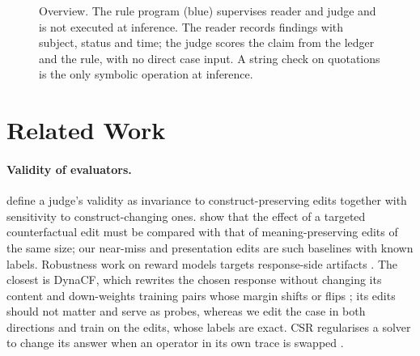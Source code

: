 \documentclass[11pt]{article}
\begin{document}
\begin{figure}[t]
\caption{Overview. The rule program (blue) supervises reader and judge and is
not executed at inference. The reader records findings with subject, status
and time; the judge scores the claim from the ledger and the rule, with no
direct case input. A string check on quotations is the only symbolic operation
at inference.}
\label{fig:overview}
\end{figure}

\section{Related Work}

\paragraph{Validity of evaluators.}
\citet{chen2026judge} define a judge's validity as invariance to
construct-preserving edits together with sensitivity to construct-changing
ones. \citet{yang2026compared} show that the effect of a targeted
counterfactual edit must be compared with that of meaning-preserving edits of
the same size; our near-miss and presentation edits are such baselines with
known labels. Robustness work on reward models
targets response-side artifacts
\citep{liu2025rrm,srivastava2026crome,zang2025auditor,xu2025contextualjudge}.
The closest is DynaCF, which rewrites the chosen response without changing its
content and down-weights training pairs whose margin shifts or flips
\citep{liu2026dynacf}; its edits should not matter and serve as probes,
whereas we edit the case in both directions and train on the edits, whose
labels are exact. CSR regularises a solver to change its answer when an
operator in its own trace is swapped \citep{shihab2025csr}.
\end{document}
